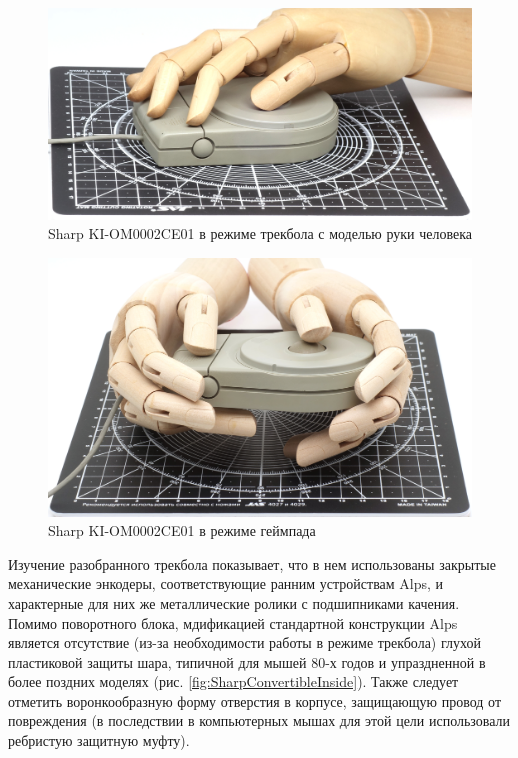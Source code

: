 \documentclass[11pt, a4paper]{article}
\begin{document}
\begin{figure}[h]
    \centering
    \includegraphics[scale=0.45]{1987_sharp_convertible/handball_30.jpg}
    \caption{Sharp KI-OM0002CE01 в режиме трекбола с моделью руки человека}
    \label{fig:SharpConvertibleBallHand}
\end{figure}

\begin{figure}[h]
    \centering
    \includegraphics[scale=0.31]{1987_sharp_convertible/handpad_30.jpg}
    \caption{Sharp KI-OM0002CE01 в режиме геймпада}
    \label{fig:SharpConvertiblePadHand}
\end{figure}

Изучение разобранного трекбола показывает, что в нем использованы закрытые механические энкодеры, соответствующие ранним устройствам Alps, и характерные для них же металлические ролики с подшипниками качения. Помимо поворотного блока, мдификацией стандартной конструкции Alps является  отсутствие (из-за необходимости работы в режиме трекбола) глухой пластиковой защиты шара, типичной для мышей 80-х годов и упраздненной в более поздних моделях (рис. \ref{fig:SharpConvertibleInside}). Также следует отметить воронкообразную форму отверстия в корпусе, защищающую провод от повреждения (в последствии в компьютерных мышах для этой цели использовали ребристую защитную муфту).
\end{document}
